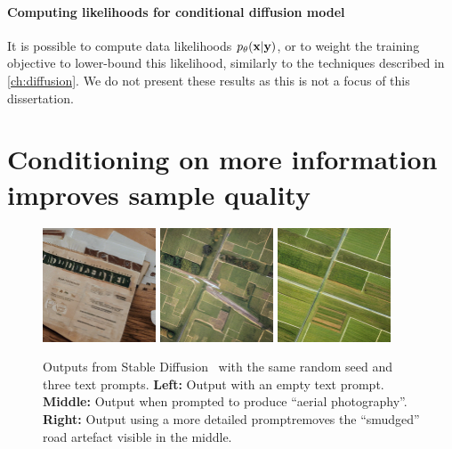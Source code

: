 \paragraph{Computing likelihoods for conditional diffusion model}
It is possible to compute data likelihoods $p_\theta({\mathbf{x}}|{\mathbf{y}})$, or to weight the training objective to lower-bound this likelihood, similarly to the techniques described in \cref{ch:diffusion}. We do not present these results as this is not a focus of this dissertation.

\section{Conditioning on more information improves sample quality} \label{sec:conditioning-on-more-improves-performance}

\begin{figure}[t]
    \centering
    \includegraphics[width=0.3\textwidth]{figs/2sdm/sd_uncond.png}
    \hfill
    \includegraphics[width=0.3\textwidth]{figs/2sdm/uncond-aerial-photo.jpg}
    \hfill
    \includegraphics[width=0.3\textwidth]{figs/2sdm/cond-aerial-photo.jpg}
    \caption{Outputs from Stable Diffusion~\citep{rombach2022high} with the same random seed and three text prompts. \textbf{Left:} Output with an empty text prompt. \textbf{Middle:} Output when prompted to produce ``aerial photography''. \textbf{Right:} Output using a more detailed prompt\protect\footnotemark removes the ``smudged'' road artefact visible in the middle.}
    \label{fig:stable-diffusion-example}
\end{figure}

